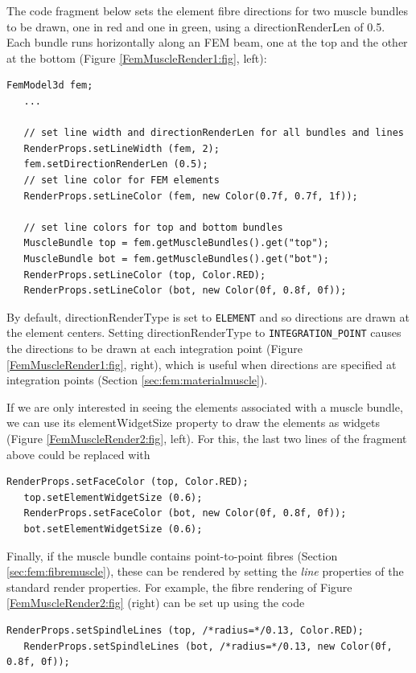 The code fragment below sets the element fibre directions for two
muscle bundles to be drawn, one in red and one in green, using a {\sf
directionRenderLen} of 0.5.  Each bundle runs horizontally along an
FEM beam, one at the top and the other at the bottom
(Figure \ref{FemMuscleRender1:fig}, left):
%
\begin{lstlisting}[]
   FemModel3d fem;
   ...

   // set line width and directionRenderLen for all bundles and lines
   RenderProps.setLineWidth (fem, 2);
   fem.setDirectionRenderLen (0.5);
   // set line color for FEM elements
   RenderProps.setLineColor (fem, new Color(0.7f, 0.7f, 1f));

   // set line colors for top and bottom bundles
   MuscleBundle top = fem.getMuscleBundles().get("top");
   MuscleBundle bot = fem.getMuscleBundles().get("bot");
   RenderProps.setLineColor (top, Color.RED);
   RenderProps.setLineColor (bot, new Color(0f, 0.8f, 0f));
\end{lstlisting}
%
By default, {\sf directionRenderType} is set to {\tt ELEMENT} and so
directions are drawn at the element centers. Setting {\sf
directionRenderType} to {\tt INTEGRATION\_POINT} causes the directions
to be drawn at each integration point
(Figure \ref{FemMuscleRender1:fig}, right), which is useful when
directions are specified at integration points
(Section \ref{sec:fem:materialmuscle}).

If we are only interested in seeing the elements associated with a
muscle bundle, we can use its {\sf elementWidgetSize} property to draw
the elements as widgets (Figure \ref{FemMuscleRender2:fig}, left).
For this, the last two lines of the fragment above could be replaced
with
%
\begin{lstlisting}[]
   RenderProps.setFaceColor (top, Color.RED);
   top.setElementWidgetSize (0.6);
   RenderProps.setFaceColor (bot, new Color(0f, 0.8f, 0f));
   bot.setElementWidgetSize (0.6);
\end{lstlisting}
%

Finally, if the muscle bundle contains point-to-point fibres
(Section \ref{sec:fem:fibremuscle}), these can be rendered by setting
the {\it line} properties of the standard render properties. For
example, the fibre rendering of Figure \ref{FemMuscleRender2:fig}
(right) can be set up using the code
%
\begin{lstlisting}[]
   RenderProps.setSpindleLines (top, /*radius=*/0.13, Color.RED);
   RenderProps.setSpindleLines (bot, /*radius=*/0.13, new Color(0f, 0.8f, 0f));
\end{lstlisting}
%

